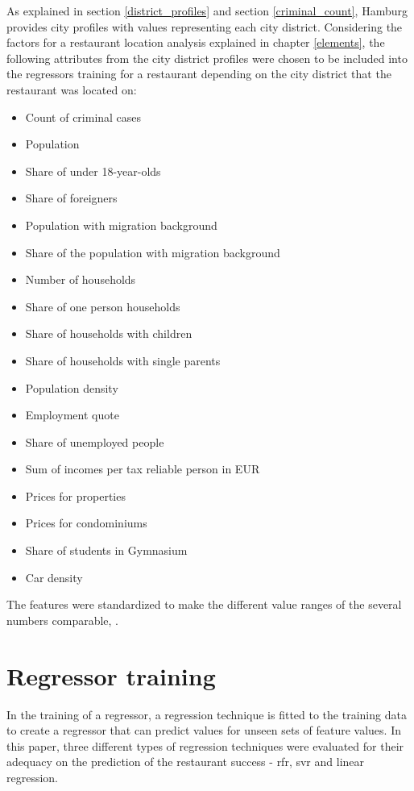 \documentclass[a4paper, 11pt, oneside]{Thesis}  %
\begin{document}
As explained in section \ref{district_profiles} and section \ref{criminal_count}, Hamburg provides city profiles with values representing each city district. Considering the factors for a restaurant location analysis explained in chapter \ref{elements}, the following attributes from the city district profiles were chosen to be included into the regressors training for a restaurant depending on the city district that the restaurant was located on:
\begin{itemize}
\item Count of criminal cases
\item Population
\item Share of under 18-year-olds
\item Share of foreigners
\item Population with migration background
\item Share of the population with migration background
\item Number of households
\item Share of one person households
\item Share of households with children
\item Share of households with single parents
\item Population density
\item Employment quote
\item Share of unemployed people
\item Sum of incomes per tax reliable person in EUR
\item Prices for properties
\item Prices for condominiums
\item Share of students in Gymnasium
\item Car density
\end{itemize}


The features were standardized to make the different value ranges of the several numbers comparable, .

\section{Regressor training}
\label{regressor_training}

In the training of a regressor, a regression technique is fitted to the training data to create a regressor that can predict values for unseen sets of feature values. In this paper, three different types of regression techniques were evaluated for their adequacy on the prediction of the restaurant success - \ac{rfr}, \ac{svr} and linear regression.
\end{document}
